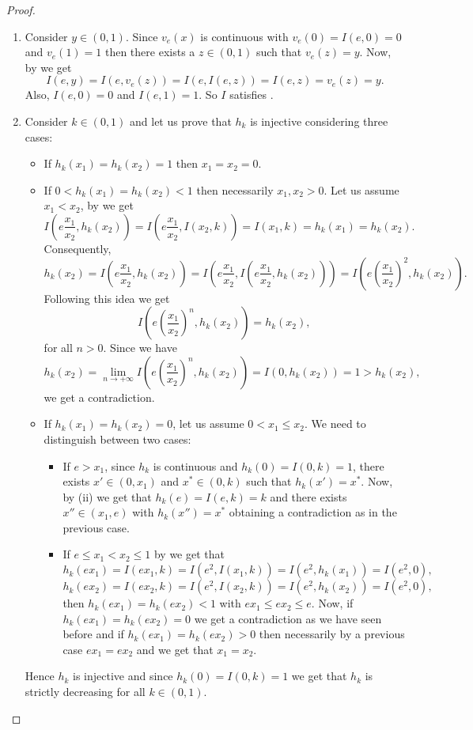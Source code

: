 \begin{proof}
\begin{enumerate}[label=(\roman*)]
		\item Consider $y \in (0,1)$. Since $v_e(x)$ is continuous with $v_{e}(0)=I(e,0)=0$ and $v_e(1)=1$ then there exists a $z\in (0,1)$ such that $v_e(z)=y$. Now, by \LIex we get
		$$I(e,y)=I(e,v_e(z))=I(e,I(e,z))=I(e,z)=v_e(z)=y.$$
		Also, $I(e,0)=0$ and $I(e,1)=1$. So $I$ satisfies \NPe.
		\item Consider $k \in (0,1)$ and let us prove that $h_k$ is injective considering three cases:
		\begin{itemize}
			\item  If $h_k(x_1)=h_k(x_2)=1$ then $x_1=x_2=0$.
			\item  If $0<h_k(x_1)=h_k(x_2)<1$ then necessarily $x_1,x_2>0$. Let us assume $x_1<x_2$,  by \LIex we get
			$$I \left( e\frac{x_1}{x_2}, h_k(x_2) \right) = I \left( e\frac{x_1}{x_2}, I(x_2,k) \right) = I(x_1,k)=h_k(x_1)=h_k(x_2).$$
			Consequently,
			$$ h_k(x_2) = I \left( e \frac{x_1}{x_2},h_k(x_2)\right) = I \left( e \frac{x_1}{x_2}, I \left( e \frac{x_1}{x_2}, h_k(x_2) \right) \right) = I \left( e \left(\frac{x_1}{x_2}\right)^2,h_k(x_2)\right).$$
			Following this idea we get
			$$I \left( e \left( \frac{x_1}{x_2}\right)^n,h_k(x_2) \right) = h_k(x_2),$$
			for all $n>0$. Since we have
			$$ h_k(x_2) = \lim_{n \to +\infty} I \left( e \left( \frac{x_1}{x_2}\right)^n,h_k(x_2)\right)=I(0,h_k(x_2))=1>h_k(x_2),$$
			we get a contradiction.
			\item  If $h_k(x_1)=h_k(x_2)=0$, let us assume $0 < x_1 \leq x_2$. We need to distinguish between two cases:
			\begin{itemize}
				\item  If $e> x_1$, since $h_k$ is continuous and $h_k(0)=I(0,k)=1$, there exists $x' \in (0,x_1)$ and $x^{*}\in(0,k)$ such that $h_k(x')=x^{*}$. Now, by (ii) we get that $h_k(e)=I(e,k)=k$ and there exists $x'' \in (x_1,e)$ with $h_k(x'')=x^{*}$ obtaining a contradiction as in the previous case. 
				\item  If $e \leq x_1 <x_2 \leq 1$ by \LIex we get that
				$$h_k(ex_1)=I(ex_1,k)=I(e^2,I(x_1,k))=I(e^2,h_k(x_1))=I(e^2,0),$$
				$$h_k(ex_2)=I(ex_2,k)=I(e^2,I(x_2,k))=I(e^2,h_k(x_2))=I(e^2,0),$$
				then $h_k(ex_1)=h_k(ex_2)<1$ with $ex_1 \leq ex_2 \leq e$. Now, if $h_k(ex_1)=h_k(ex_2)=0$ we get a contradiction as we have seen before and if $h_k(ex_1)=h_k(ex_2)>0$ then necessarily by a previous case $ex_1=ex_2$ and we get that $x_1=x_2$.
			\end{itemize}
		\end{itemize}
		Hence $h_k$ is injective and since $h_k(0)=I(0,k)=1$ we get that $h_k$ is strictly decreasing for all $k \in (0,1)$.

\end{enumerate}
\end{proof}
